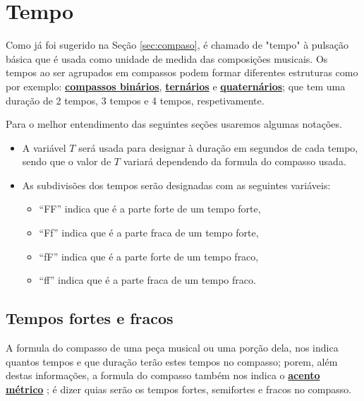 \section{Tempo}
\label{sec:Tempo}

Como já foi sugerido na Seção \ref{sec:compaso}, é chamado de "tempo" 
à pulsação básica que é usada como unidade de medida das composições musicais.
Os tempos ao ser agrupados em compassos podem formar diferentes estruturas como por exemplo: 
\hyperref[subsec:compassobinario]{\textbf{compassos binários}}, \hyperref[subsec:compassoternario]{\textbf{ternários}} e \hyperref[subsec:compassoquaternario]{\textbf{quaternários}}; que tem uma duração de 2 tempos, 
3 tempos e 4 tempos, respetivamente. 

\begin{notation}[] Para o melhor entendimento das seguintes seções usaremos algumas notações.
\begin{itemize}
\item A variável $T$ será usada para designar à duração em segundos de cada tempo,
sendo que o valor de $T$ variará dependendo da formula do compasso usada.

\item As subdivisões dos tempos serão designadas com as seguintes variáveis:
\begin{itemize}
\item ``FF'' indica que é a parte forte de um tempo forte,
\item ``Ff'' indica que é a parte fraca de um tempo forte,
\item ``fF'' indica que é a parte forte de um tempo fraco,
\item ``ff'' indica que é a parte fraca de um tempo fraco.
\end{itemize}
\end{itemize}

\end{notation}

\subsection{Tempos fortes e fracos}

A formula do compasso de uma peça musical ou uma porção dela, 
nos indica quantos tempos e que duração terão estes tempos no compasso; 
porem, além destas informações, 
a formula do compasso também nos indica o \hyperref[def:acentometrico]{\textbf{acento métrico}} \cite[pp. 70]{cardoso1973curso}; 
é dizer quias serão os tempos fortes, semifortes e fracos no compasso.


